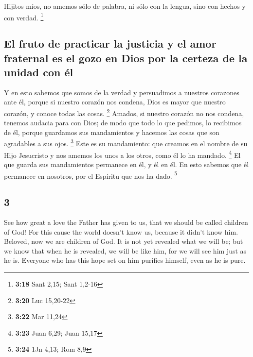 \begin{paracol}{2}
 Hijitos míos, no amemos sólo de palabra, ni sólo con la
lengua, sino con hechos y con verdad. \footnote{\textbf{3:18} Sant 2,15;
  Sant 1,2-16}

\hypertarget{el-fruto-de-practicar-la-justicia-y-el-amor-fraternal-es-el-gozo-en-dios-por-la-certeza-de-la-unidad-con-uxe9l}{%
\subsection{El fruto de practicar la justicia y el amor fraternal es el
gozo en Dios por la certeza de la unidad con
él}\label{el-fruto-de-practicar-la-justicia-y-el-amor-fraternal-es-el-gozo-en-dios-por-la-certeza-de-la-unidad-con-uxe9l}}

 Y en esto sabemos que somos de la verdad y persuadimos a
nuestros corazones ante él,  porque si nuestro corazón
nos condena, Dios es mayor que nuestro corazón, y conoce todas las
cosas. \footnote{\textbf{3:20} Luc 15,20-22}  Amados, si
nuestro corazón no nos condena, tenemos audacia para con Dios;
 de modo que todo lo que pedimos, lo recibimos de él,
porque guardamos sus mandamientos y hacemos las cosas que son agradables
a sus ojos. \footnote{\textbf{3:22} Mar 11,24}  Este es
su mandamiento: que creamos en el nombre de su Hijo Jesucristo y nos
amemos los unos a los otros, como él lo ha mandado. \footnote{\textbf{3:23}
  Juan 6,29; Juan 15,17}  El que guarda sus mandamientos
permanece en él, y él en él. En esto sabemos que él permanece en
nosotros, por el Espíritu que nos ha dado. \footnote{\textbf{3:24} 1Jn
  4,13; Rom 8,9}

\switchcolumn
\begin{otherlanguage}{english}

\hypertarget{section-5}{%
\section{3}\label{section-5}}

 See how great a love the Father has given to us, that we
should be called children of God! For this cause the world doesn't know
us, because it didn't know him.  Beloved, now we are
children of God. It is not yet revealed what we will be; but we know
that when he is revealed, we will be like him, for we will see him just
as he is.  Everyone who has this hope set on him purifies
himself, even as he is pure.


\end{otherlanguage}
\end{paracol}
